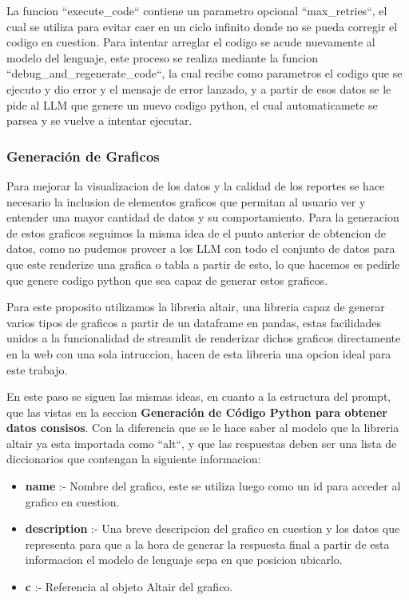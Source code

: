 La funcion ``execute\_code`` contiene un parametro opcional ``max\_retries``, el cual se utiliza para evitar caer en un ciclo infinito donde no se pueda corregir el codigo en cuestion. Para intentar arreglar el codigo se acude nuevamente al modelo del lenguaje, este proceso se realiza mediante la funcion ``debug\_and\_regenerate\_code``, la cual recibe como parametros el codigo que se ejecuto y dio error y el mensaje de error lanzado, y a partir de esos datos se le pide al LLM que genere un nuevo codigo python, el cual automaticamete se parsea y se vuelve a intentar ejecutar.

\subsubsection{Generación de Graficos}

Para mejorar la visualizacion de los datos y la calidad de los reportes se hace necesario la inclusion de elementos graficos que permitan al usuario ver y entender una mayor cantidad de datos y su comportamiento. Para la generacion de estos graficos seguimos la misma idea de el punto anterior de obtencion de datos, como no pudemos proveer a los LLM con todo el conjunto de datos para que este renderize una grafica o tabla a partir de esto, lo que hacemos es pedirle que genere codigo python que sea capaz de generar estos graficos.

Para este proposito utilizamos la libreria altair\cite{altair}, una libreria capaz de generar varios tipos de graficos a partir de un dataframe en pandas, estas facilidades unidos a la funcionalidad de streamlit de renderizar dichos graficos directamente en la web con una sola intruccion, hacen de esta libreria una opcion ideal para este trabajo.

En este paso se siguen las mismas ideas, en cuanto a la estructura del prompt, que las vistas en la seccion \textbf{Generación de Código Python para obtener datos consisos}. Con la diferencia que se le hace saber al modelo que la libreria altair ya esta importada como ``alt``, y que las respuestas deben ser una lista de diccionarios que contengan la siguiente informacion:

\begin{itemize}
	\item \textbf{name} :- Nombre del grafico, este se utiliza luego como un id para acceder al grafico en cuestion.
	\item \textbf{description} :- Una breve descripcion del grafico en cuestion y los datos que representa para que a la hora de generar la respuesta final a partir de esta informacion el modelo de lenguaje sepa en que posicion ubicarlo.
	\item \textbf{c} :- Referencia al objeto Altair del grafico.
\end{itemize}

